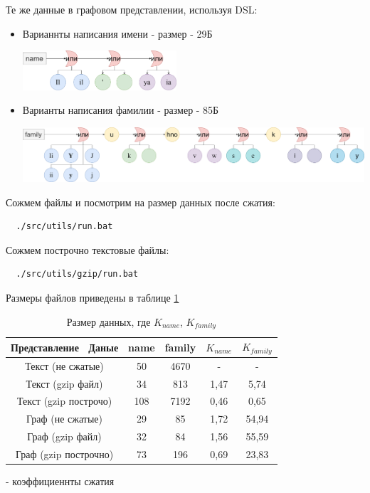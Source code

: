 \documentclass[12pt,a4paper]{article}
\begin{document}
Те же данные в графовом представлении, используя DSL:
\begin{itemize}
    \item Варианнты написания имени -  размер - 29Б
    
\includegraphics[width=0.45\textwidth]{graph-name}

\item Варианты написания фамилии -  размер - 85Б

\includegraphics[width=1\textwidth]{graph-family}

\end{itemize}

Сожмем файлы и посмотрим на размер данных после сжатия:
\begin{lstlisting}
  ./src/utils/run.bat
\end{lstlisting}

Сожмем построчно текстовые файлы:
\begin{lstlisting}
  ./src/utils/gzip/run.bat
\end{lstlisting}

Размеры файлов приведены в таблице \ref{files_size}

\begin{table}
\begin{center}
\begin{tabular}{|c|c|c|c|c|}
\hline
Представление \ Даные & name & family & $K_{name}$ & $K_{family}$\\
\hline
Текст (не сжатые) & 50 & 4670 & - & - \\
\hline
Текст (gzip файл) & 34 & 813 & 1,47 & 5,74 \\
\hline
Текст (gzip построчо) & 108 & 7192 & 0,46 & 0,65 \\
\hline
Граф (не сжатые) & 29 & 85 & 1,72 & 54,94 \\
\hline
Граф (gzip файл) & 32 & 84 & 1,56 & 55,59 \\
\hline
Граф (gzip построчно) & 73 & 196 & 0,69 & 23,83 \\
\hline
\end{tabular}
\end{center}
\caption{\label{files_size}Размер данных, где $K_{name}$, $K_{family}$} - коэффициеннты сжатия
\end{table} 
\end{document}
